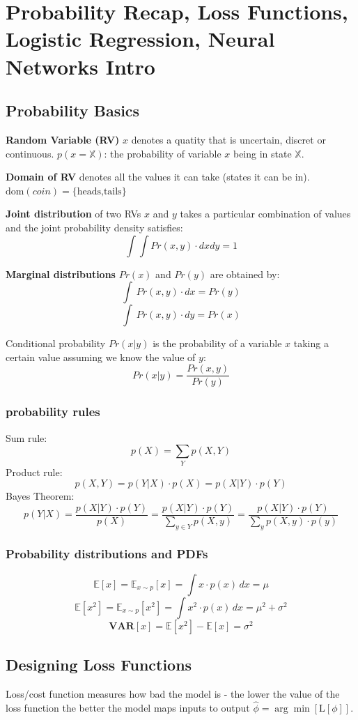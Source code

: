 \section{Probability Recap, Loss Functions, Logistic Regression, Neural Networks Intro}
\subsection{Probability Basics}
\textbf{Random Variable (RV)} \(x\) denotes a quatity that is uncertain, discret or continuous.
\(p(x = \mathbb{X})\): the probability of variable \(x\) being in state \(\mathbb{X}\).

\textbf{Domain of RV} denotes all the values it can take (states it can be in).
\(\text{dom}(coin) = \{\text{heads,tails}\}\)


\textbf{Joint distribution} of two RVs \(x\) and \(y\) takes a particular combination of values and the joint probability density satisfies:
\[
\int\int Pr(x,y) \cdot dxdy = 1
\]

\textbf{Marginal distributions} \(Pr(x)\) and \(Pr(y)\) are obtained by:
\[
    \int\ Pr(x,y) \cdot dx = Pr(y)
\]
\[
    \int\ Pr(x,y) \cdot dy = Pr(x)
\]

Conditional probability \(Pr(x|y)\) is the probability of a variable \(x\) taking a certain value assuming we know the value of \(y\):
\[
Pr(x|y) = \frac{Pr(x,y)}{Pr(y)}
\]

\subsubsection{probability rules}
Sum rule:
\[
p(X) = \sum_{Y}p(X,Y)
\]
Product rule:
\[
p(X,Y) = p(Y|X) \cdot p(X) = p(X|Y) \cdot p(Y)
\]
Bayes Theorem:
\[
p(Y|X) = \frac{p(X|Y)\cdot p(Y)}{p(X)} = \frac{p(X|Y)\cdot p(Y)}{\sum_{y \in Y}p(X,y)} = \frac{p(X|Y)\cdot p(Y)}{\sum_{y}p(X,y)\cdot p(y)}
\]
\subsubsection*{Probability distributions and PDFs}
\[
\mathbb{E}\left[x\right] = \mathbb{E}_{x \sim p}\left[x\right] = \int x \cdot p(x)\,dx = \mu
\]
\[
\mathbb{E}\left[x^2\right] = \mathbb{E}_{x \sim p}\left[x^2\right] = \int x^2 \cdot p(x)\,dx = \mu^2 + \sigma^2
\]
\[
\mathbf{VAR}\left[x\right] = \mathbb{E}\left[x^2\right] - \mathbb{E}\left[x\right] = \sigma^2
\]
\subsection{Designing Loss Functions}
Loss/cost function measures how bad the model is - the lower the value of the loss function the better the model maps inputs to output \(\hat{\phi} = \arg\min\left[\text{L}[\phi]\right]\).


